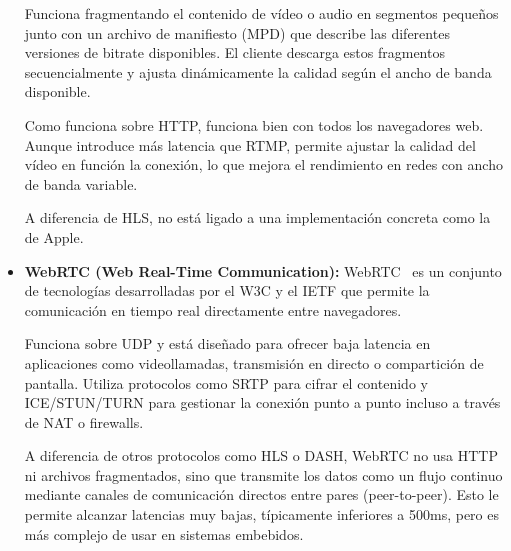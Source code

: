 \begin{itemize}
    Funciona fragmentando el contenido de vídeo o audio en segmentos pequeños junto con un archivo de manifiesto (MPD) que describe las diferentes versiones de bitrate disponibles.
    El cliente descarga estos fragmentos secuencialmente y ajusta dinámicamente la calidad según el ancho de banda disponible.

    Como funciona sobre HTTP, funciona bien con todos los navegadores web.
    Aunque introduce más latencia que RTMP, permite ajustar la calidad del vídeo en función la conexión, lo que mejora el rendimiento en redes con ancho de banda variable.

    A diferencia de HLS, no está ligado a una implementación concreta como la de Apple.

    \item \textbf{WebRTC (Web Real-Time Communication):} WebRTC~\citep{webrtc_w3c} es un conjunto de tecnologías desarrolladas por el W3C y el IETF que permite la comunicación en tiempo real directamente entre navegadores.

    Funciona sobre UDP y está diseñado para ofrecer baja latencia en aplicaciones como videollamadas, transmisión en directo o compartición de pantalla.
    Utiliza protocolos como SRTP para cifrar el contenido y ICE/STUN/TURN para gestionar la conexión punto a punto incluso a través de NAT o firewalls.

    A diferencia de otros protocolos como HLS o DASH, WebRTC no usa HTTP ni archivos fragmentados, sino que transmite los datos como un flujo continuo mediante canales de comunicación directos entre pares (peer-to-peer).
    Esto le permite alcanzar latencias muy bajas, típicamente inferiores a 500ms, pero es más complejo de usar en sistemas embebidos.

\end{itemize}

\begin{table}[h]
    \centering
    \footnotesize
    \caption{Comparativa de protocolos de transmisión de vídeo en tiempo real}
    \label{tab:video_streaming_protocols}
\end{table}


